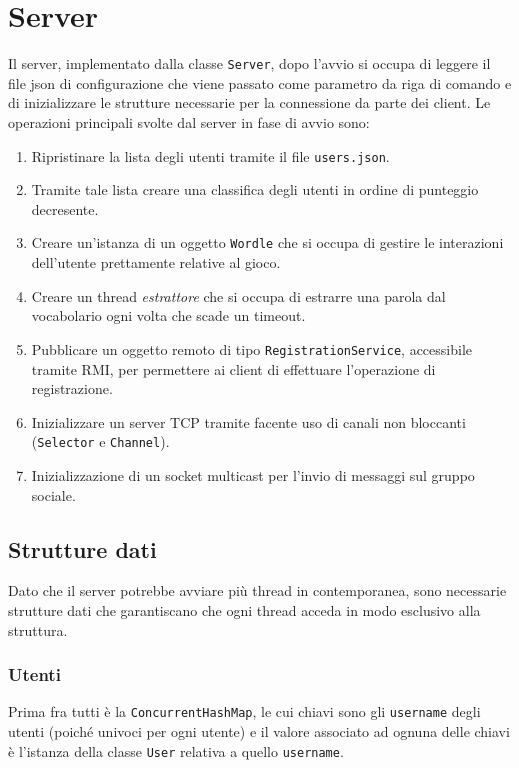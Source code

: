 \section{Server}
Il server, implementato dalla classe \verb|Server|, dopo l'avvio si occupa di leggere il file json
di configurazione che viene passato come parametro da riga di comando e di inizializzare le
strutture necessarie per la connessione da parte dei client. Le operazioni principali svolte dal
server in fase di avvio sono:
\begin{enumerate}
	\item Ripristinare la lista degli utenti tramite il file \verb|users.json|.
	\item Tramite tale lista creare una classifica degli utenti in ordine di punteggio decresente.
	\item Creare un'istanza di un oggetto \verb|Wordle| che si occupa di gestire le interazioni
	      dell'utente prettamente relative al gioco.
	\item Creare un thread \emph{estrattore} che si occupa di estrarre una parola dal vocabolario
	      ogni volta che scade un timeout.
	\item Pubblicare un oggetto remoto di tipo \verb|RegistrationService|, accessibile tramite RMI,
	      per permettere ai client di effettuare l'operazione di registrazione.
	\item Inizializzare un server TCP tramite facente uso di canali non bloccanti (\verb|Selector|
	      e \verb|Channel|).
	\item Inizializzazione di un socket multicast per l'invio di messaggi sul gruppo sociale.
\end{enumerate}

\subsection{Strutture dati}
Dato che il server potrebbe avviare più thread in contemporanea, sono necessarie strutture dati che
garantiscano che ogni thread acceda in modo esclusivo alla struttura.

\subsubsection{Utenti}
Prima fra tutti è la \verb|ConcurrentHashMap|, le cui chiavi sono gli \verb|username| degli utenti
(poiché univoci per ogni utente) e il valore associato ad ognuna delle chiavi è l'istanza della
classe \verb|User| relativa a quello \verb|username|.

